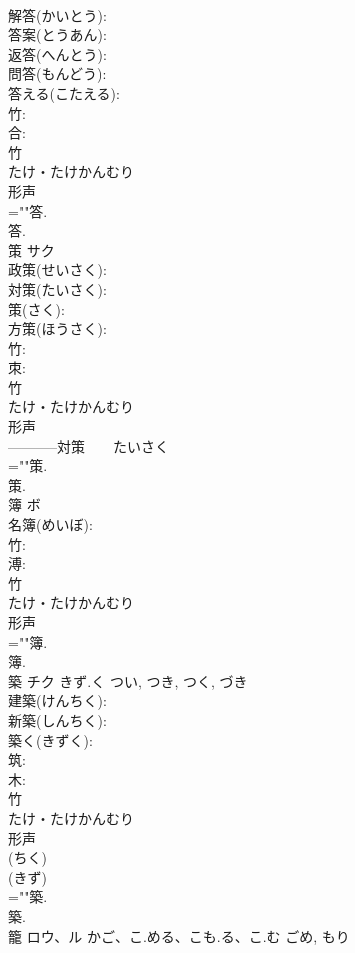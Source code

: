 \documentclass[8pt]{extreport}
\begin{document}
\begin{CJK}{UTF8}{min}
\\	解答(かいとう): 
\\	答案(とうあん): 
\\	返答(へんとう): 
\\	問答(もんどう): 
\\	答える(こたえる): 
\\	竹: 
\\	合: 
\\	竹	
\\	たけ・たけかんむり	
\\	形声 
\\	=""答.
\\	答.
\\	策	サク			
\\	政策(せいさく): 
\\	対策(たいさく): 
\\	策(さく): 
\\	方策(ほうさく): 
\\	竹: 
\\	朿: 
\\	竹	
\\	たけ・たけかんむり	
\\	形声 
\\	-----------対策　　たいさく　　
\\	=""策.
\\	策.
\\	簿	ボ			
\\	名簿(めいぼ): 
\\	竹: 
\\	溥: 
\\	竹	
\\	たけ・たけかんむり	
\\	形声 
\\	=""簿.
\\	簿.
\\	築	チク	きず.く	つい, つき, つく, づき	
\\	建築(けんちく): 
\\	新築(しんちく): 
\\	築く(きずく): 
\\	筑: 
\\	木: 
\\	竹	
\\	たけ・たけかんむり	
\\	形声 
\\	(ちく) 
\\	(きず) 
\\	=""築.
\\	築.
\\	籠	ロウ、ル	かご、こ.める、こも.る、こ.む	ごめ, もり	

\end{CJK}
\end{document}
